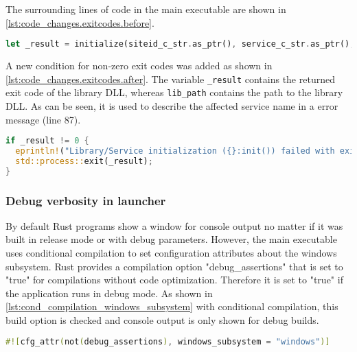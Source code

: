 The surrounding lines of code in the main executable are shown in \autoref{lst:code_changes.exitcodes.before}.
\begin{lstlisting}[label=lst:code_changes.exitcodes.before, caption={Former code snippet from main executable for calling the microservice library code in Rust (/Microservices/OpenTwin/src/main.rs)}, language=rust, firstnumber=85]
let _result = initialize(siteid_c_str.as_ptr(), service_c_str.as_ptr(), db_c_str.as_ptr(), dir_c_str.as_ptr());
\end{lstlisting}

A new condition for non-zero exit codes was added as shown in \autoref{lst:code_changes.exitcodes.after}. The variable \texttt{\_result}  contains the returned exit code of the library \ac{DLL}, whereas \texttt{lib\_path} contains the path to the library \ac{DLL}. As can be seen, it is used to describe the affected service name in a error message (line 87).
\begin{lstlisting}[label=lst:code_changes.exitcodes.after, caption={Code changes in Rust main executable for additional treatment of exit codes (/Microservices/OpenTwin/src/main.rs)}, language=rust, firstnumber=86]
if _result != 0 {
  eprintln!("Library/Service initialization ({}:init()) failed with exit code {}", lib_path, _result);
  std::process::exit(_result);
}
\end{lstlisting}

 
\subsubsection*{Debug verbosity in launcher}
By default Rust programs show a window for console output no matter if it was built in release mode or with debug parameters. However, the main executable uses conditional compilation to set configuration attributes about the windows subsystem.
Rust provides a compilation option "debug\_assertions" that is set to "true" for compilations without code optimization\cite{Rust.20230209}. Therefore it is set to "true" if the application runs in debug mode. As shown in \autoref{lst:cond_compilation_windows_subsystem} with conditional compilation, this build option is checked and console output is only shown for debug builds.
\begin{lstlisting}[label=lst:cond_compilation_windows_subsystem, caption={Conditional compilation for disabling console output in non-debug builds (/Microservices/OpenTwin/src/main.rs)}, language=rust, firstnumber=2]
#![cfg_attr(not(debug_assertions), windows_subsystem = "windows")]
\end{lstlisting}

